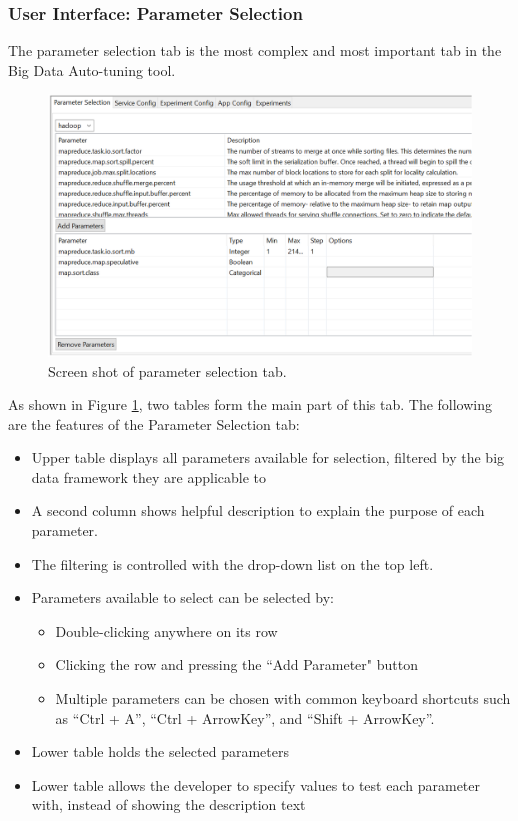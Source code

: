 \subsubsection{User Interface: Parameter Selection}
The parameter selection tab is the most complex and most important tab in the Big Data Auto-tuning tool.\\
\begin{figure}[h]
\centering
\caption{Screen shot of parameter selection tab.}
\label{fig:param}
\includegraphics[width=\textwidth]{images/param.png}
\end{figure}
As shown in Figure \ref{fig:param}, two tables form the main part of this tab. The following are the features of the Parameter Selection tab:
\begin{itemize}
\item Upper table displays all parameters available for selection, filtered by the big data framework they are applicable to
\item A second column shows helpful description to explain the purpose of each parameter.
\item The filtering is controlled with the drop-down list on the top left.
\item Parameters available to select can be selected by:
	\begin{itemize}
	\item Double-clicking anywhere on its row
    \item Clicking the row and pressing the ``Add Parameter" button
    \item Multiple parameters can be chosen with common keyboard shortcuts such as ``Ctrl + A'', ``Ctrl + ArrowKey'', and ``Shift + ArrowKey''.
	\end{itemize}
\item Lower table holds the selected parameters
\item Lower table allows the developer to specify values to test each parameter with, instead of showing the description text
\end{itemize}  
